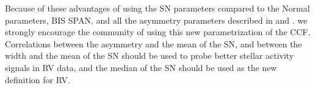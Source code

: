 \documentclass{aa}
\begin{document}
Because of these advantages of using the SN parameters compared to the Normal parameters, BIS SPAN, and all the asymmetry parameters described in \citet{Boisse-2011} and \citet{Figueira-2013}. we strongly encourage the community of using this new parametrization of the CCF.
Correlations between the asymmetry and the mean of the SN, and between the width and the mean of the SN should be used to probe better stellar activity signals in RV data, and the median of the SN should be used as the new definition for RV.




\end{document}
